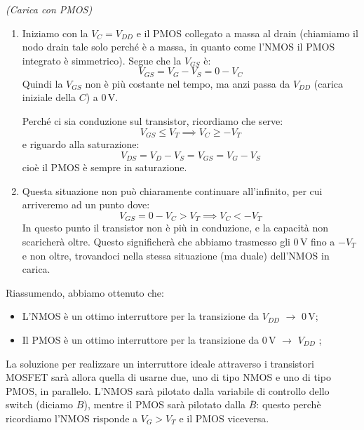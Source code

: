 \documentclass[a4paper,11pt]{article}
\begin{document}
\begin{itemize}
\par\smallskip
\textit{(Carica con PMOS)}
\begin{enumerate}
	\item 
Iniziamo con la $V_C = V_{DD}$ e il PMOS collegato a massa al drain (chiamiamo il nodo drain tale solo perché è a massa, in quanto come l'NMOS il PMOS integrato è simmetrico). Segue che la $V_{GS}$ è:
$$
V_{GS} = V_G - V_S = 0 - V_C
$$
Quindi la $V_{GS}$ non è più costante nel tempo, ma anzi passa da $V_{DD}$ (carica iniziale della $C$) a $0 \, \mathrm{V}$. 

Perché ci sia conduzione sul transistor, ricordiamo che serve:
$$
V_{GS} \leq V_T \implies V_C \geq -V_T
$$
e riguardo alla saturazione:
$$
V_{DS} = V_D - V_S = V_{GS} = V_G - V_S 
$$
cioè il PMOS è sempre in saturazione.

	\item
Questa situazione non può chiaramente continuare all'infinito, per cui arriveremo ad un punto dove:
$$
V_{GS} = 0 - V_C > V_T \implies V_C < -V_T
$$
In questo punto il transistor non è più in conduzione, e la capacità non scaricherà oltre. Questo significherà che abbiamo trasmesso gli $0 \, \mathrm{V}$ fino a $- V_T$ e non oltre, trovandoci nella stessa situazione (ma duale) dell'NMOS in carica.
\end{enumerate}

\end{itemize}

Riassumendo, abbiamo ottenuto che:
\begin{itemize}
	\item L'NMOS è un ottimo interruttore per la transizione da $V_{DD}$ $\rightarrow$ $0 \, \mathrm{V}$;
	\item Il PMOS è un ottimo interruttore per la transizione da $0 \, \mathrm{V}$ $\rightarrow$ $V_{DD}$ ;
\end{itemize}

La soluzione per realizzare un interruttore ideale attraverso i transistori MOSFET sarà allora quella di usarne due, uno di tipo NMOS e uno di tipo PMOS, in parallelo. L'NMOS sarà pilotato dalla variabile di controllo dello switch (diciamo $B$), mentre il PMOS sarà pilotato dalla $\overline{B}$: questo perchè ricordiamo l'NMOS risponde a $V_G > V_T$ e il PMOS viceversa.

\begin{center}
\end{center}
\end{document}
